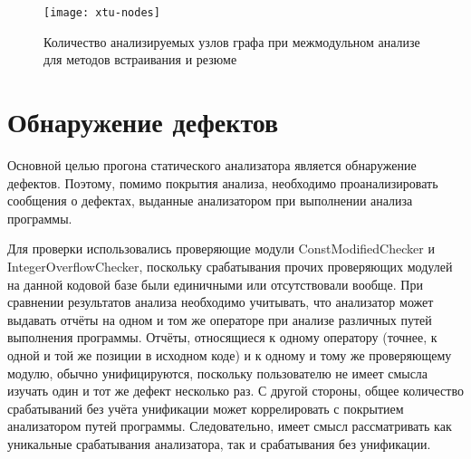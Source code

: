 \begin{figure}[h]
   \centering
   \texttt{[image: xtu-nodes]}
   \caption{Количество анализируемых узлов графа при межмодульном анализе для методов встраивания и резюме}\label{pic:xtu-nodes}
\end{figure}


\section{Обнаружение дефектов}

Основной целью прогона статического анализатора является обнаружение дефектов. Поэтому, помимо покрытия анализа, необходимо проанализировать сообщения о дефектах, выданные анализатором при выполнении анализа программы.

Для проверки использовались проверяющие модули ConstModifiedChecker и IntegerOverflowChecker, поскольку срабатывания прочих проверяющих модулей на данной кодовой базе были единичными или отсутствовали вообще. При сравнении результатов анализа необходимо учитывать, что анализатор может выдавать отчёты на одном и том же операторе при анализе различных путей выполнения программы. Отчёты, относящиеся к одному оператору (точнее, к одной и той же позиции в исходном коде) и к одному и тому же проверяющему модулю, обычно унифицируются, поскольку пользователю не имеет смысла изучать один и тот же дефект несколько раз. С другой стороны, общее количество срабатываний без учёта унификации может коррелировать с покрытием анализатором путей программы. Следовательно, имеет смысл рассматривать как уникальные срабатывания анализатора, так и срабатывания без унификации.


